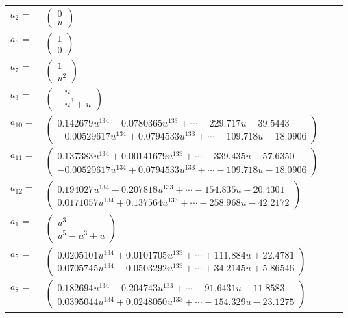 \documentclass[1p]{elsarticle_modified}
\theoremstyle{definition}
\begin{document}
\begin{tabular}{m{7pt} m{180pt} m{7pt} m{180pt} }
\flushright $a_{2}=$&$\begin{pmatrix}0\\u\end{pmatrix}$ \\
\flushright $a_{6}=$&$\begin{pmatrix}1\\0\end{pmatrix}$ \\
\flushright $a_{7}=$&$\begin{pmatrix}1\\u^2\end{pmatrix}$ \\
\flushright $a_{3}=$&$\begin{pmatrix}- u\\- u^3+u\end{pmatrix}$ \\
\flushright $a_{10}=$&$\begin{pmatrix}0.142679 u^{134}-0.0780365 u^{133}+\cdots-229.717 u-39.5443\\-0.00529617 u^{134}+0.0794533 u^{133}+\cdots-109.718 u-18.0906\end{pmatrix}$ \\
\flushright $a_{11}=$&$\begin{pmatrix}0.137383 u^{134}+0.00141679 u^{133}+\cdots-339.435 u-57.6350\\-0.00529617 u^{134}+0.0794533 u^{133}+\cdots-109.718 u-18.0906\end{pmatrix}$ \\
\flushright $a_{12}=$&$\begin{pmatrix}0.194027 u^{134}-0.207818 u^{133}+\cdots-154.835 u-20.4301\\0.0171057 u^{134}+0.137564 u^{133}+\cdots-258.968 u-42.2172\end{pmatrix}$ \\
\flushright $a_{1}=$&$\begin{pmatrix}u^3\\u^5- u^3+u\end{pmatrix}$ \\
\flushright $a_{5}=$&$\begin{pmatrix}0.0205101 u^{134}+0.0101705 u^{133}+\cdots+111.884 u+22.4781\\0.0705745 u^{134}-0.0503292 u^{133}+\cdots+34.2145 u+5.86546\end{pmatrix}$ \\
\flushright $a_{8}=$&$\begin{pmatrix}0.182694 u^{134}-0.204743 u^{133}+\cdots-91.6431 u-11.8583\\0.0395044 u^{134}+0.0248050 u^{133}+\cdots-154.329 u-23.1275\end{pmatrix}$ \\

\end{tabular}
\end{document}
